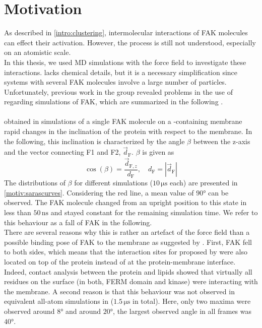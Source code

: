 \chapter{Motivation}
\label{motivation}
As described in \autoref{intro:clustering}, intermolecular interactions of FAK molecules can effect their activation. However, the process is still not understood, especially on an atomistic scale.\\
In this thesis, we used MD simulations with the \martini{} force field to investigate these interactions. \martini{} lacks chemical details, but it is a necessary simplification since systems with several FAK molecules involve a large number of particles. Unfortunately, previous work in the group revealed problems in the use of \martini{} regarding simulations of FAK, which are summarized in the following \autocite{sara}.\\
\\
\textcite{sara} obtained in simulations of a single FAK molecule on a \pip{}-containing membrane rapid changes in the inclination of the protein with respect to the membrane. In the following, this inclination is characterized by the angle $\beta$ between the z-axis and the vector connecting F1 and F2, $\vec{d}_\text{F}$. $\beta$ is given as
\begin{equation}
\cos\left(\beta\right) = \frac{\vec{d}_{\text{F}, z}}{d_\text{F}},\quad d_\text{F} = \left|\vec{d}_\text{F}\right|
\end{equation}
The distributions of $\beta$ for different simulations ($10\,\si{\micro\second}$ each) are presented in \autoref{motiv:sarascurves}. Considering the red line, a mean value of $90°$ can be observed. The FAK molecule changed from an upright position to this state in less than $50\,\si{\nano\second}$ and stayed constant for the remaining simulation time. We refer to this behaviour as a fall of FAK in the following.\\
There are several reasons why this is rather an artefact of the \martini{} force field than a possible binding pose of FAK to the membrane as suggested by \textcite{pap002}. First, FAK fell to both sides, which means that the interaction sites for \pip{} proposed by \textcite{pap002} were also located on top of the protein instead of at the protein-membrane interface. Indeed, contact analysis between the protein and \pip{} lipids showed that virtually all residues on the surface (in both, FERM domain and kinase) were interacting with the membrane. A second reason is that this behaviour was not observed in equivalent all-atom simulations in \charmm{} ($1.5\,\si{\micro\second}$ in total). Here, only two maxima were observed around $8°$ and around $20°$, the largest observed angle in all frames was $40°$.\\
